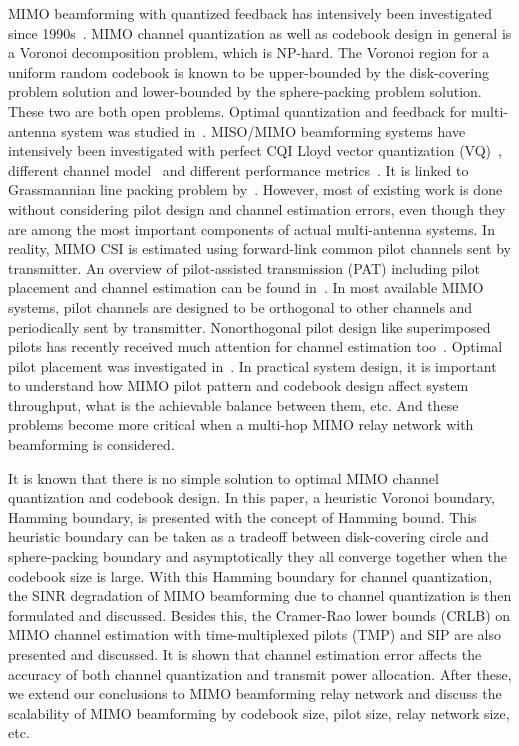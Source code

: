 \documentclass[10pt,fleqn, twocolumn]{IEEEtran}
\begin{document}
MIMO beamforming with quantized feedback has intensively been
investigated since 1990s~\cite{Gerlach94}. MIMO channel
quantization as well as codebook design in general is a Voronoi
decomposition problem, which is NP-hard. The Voronoi region for a
uniform random codebook is known to be upper-bounded by the
disk-covering problem solution and lower-bounded by the
sphere-packing problem solution. These two are both open problems.
Optimal quantization and feedback for multi-antenna system was
studied in~\cite{Lau04}. MISO/MIMO beamforming systems have
intensively been investigated with perfect CQI Lloyd vector
quantization (VQ)~\cite{Narula98}, different channel
model~\cite{Mukka03} and different performance
metrics~\cite{PXia04,Roh04}. It is linked to Grassmannian line
packing problem by~\cite{Love02}. However, most of existing work
is done without considering pilot design and channel estimation
errors, even though they are among the most important components
of actual multi-antenna systems. In reality, MIMO CSI is estimated
using forward-link common pilot channels sent by transmitter. An
overview of pilot-assisted transmission (PAT) including pilot
placement and channel estimation can be found in~\cite{Tong04}. In
most available MIMO systems, pilot channels are designed to be
orthogonal to other channels and periodically sent by transmitter.
Nonorthogonal pilot design like superimposed pilots has recently
received much attention for channel estimation
too~\cite{Coldrey06}. Optimal pilot placement was investigated
in~\cite{Dong02}. In practical system design, it is important to
understand how MIMO pilot pattern and codebook design affect
system throughput, what is the achievable balance between them,
etc. And these problems become more critical when a multi-hop MIMO
relay network with beamforming is considered.

It is known that there is no simple solution to optimal MIMO
channel quantization and codebook design. In this paper, a
heuristic Voronoi boundary, Hamming boundary, is presented with
the concept of Hamming bound. This heuristic boundary can be taken
as a tradeoff between disk-covering circle and sphere-packing
boundary and asymptotically they all converge together when the
codebook size is large. With this Hamming boundary for channel
quantization, the SINR degradation of MIMO beamforming due to
channel quantization is then formulated and discussed. Besides
this, the Cramer-Rao lower bounds (CRLB) on MIMO channel
estimation with time-multiplexed pilots (TMP) and SIP are also
presented and discussed. It is shown that channel estimation error
affects the accuracy of both channel quantization and transmit
power allocation. After these, we extend our conclusions to MIMO
beamforming relay network and discuss the scalability of MIMO
beamforming by codebook size, pilot size, relay network size, etc.
\end{document}
